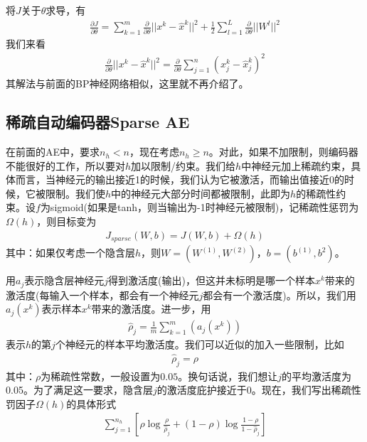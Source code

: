         将$J$关于$\theta$求导，有
        \begin{align*}
        \frac{\partial J}{\partial \theta} = \sum_{k=1}^m\frac{\partial }{\partial \theta}||x^{k} - \hat{x}^k||^2 + \frac{1}{2}\sum_{l=1}^L \frac{\partial }{\partial \theta}||W^l||^2
        \end{align*}
        我们来看
        \begin{align*}
        \frac{\partial }{\partial \theta}||x^{k} - \hat{x}^k||^2  = \frac{\partial }{\partial \theta}\sum_{j=1}^{n}(x_j^k - \hat{x}_j^k)^2
        \end{align*}
        其解法与前面的BP神经网络相似，这里就不再介绍了。
    \subsection{稀疏自动编码器Sparse AE}
        \par
        在前面的AE中，要求$n_h<n$，现在考虑$n_h \geqslant n$。对此，如果不加限制，则编码器不能很好的工作，所以要对$h$加以限制/约束。我们给$h$中神经元加上稀疏约束，具体而言，当神经元的输出接近1的时候，我们认为它被激活，而输出值接近0的时候，它被限制。我们使$h$中的神经元大部分时间都被限制，此即为$h$的稀疏性约束。设$f$为sigmoid(如果是tanh，则当输出为-1时神经元被限制)，记稀疏性惩罚为$\Omega(h)$，则目标变为
        \begin{align*}
        J_{sparse}(W,b) = J(W,b) + \Omega (h)
        \end{align*}
        其中：如果仅考虑一个隐含层$h$，则$W = (W^{(1)},W^{(2)})$，$b= (b^{(1)},b^{2})$。
        \par
        用$a_j$表示隐含层神经元$j$得到激活度(输出)，但这并未标明是哪一个样本$x^k$带来的激活度(每输入一个样本，都会有一个神经元$j$都会有一个激活度)。所以，我们用$a_j(x^k)$表示样本$x^k$带来的激活度。进一步，用
        \begin{align*}
        \hat{\rho}_j = \frac{1}{m} \sum_{k=1}^m \left( a_j(x^k) \right)
        \end{align*}
        表示$h$的第$j$个神经元的样本平均激活度。我们可以近似的加入一些限制，比如
        \begin{align*}
        \hat{\rho}_j = \rho
        \end{align*}
        其中：$\rho$为稀疏性常数，一般设置为$0.05$。换句话说，我们想让$j$的平均激活度为0.05。为了满足这一要求，隐含层$j$的激活度庇护接近于0。现在，我们写出稀疏性罚因子$\Omega(h)$的具体形式
        \begin{align*}
        \sum_{j=1}^{n_h} \left[ \rho\log\frac{\rho}{\hat{\rho}_j}+ (1-\rho)\log\frac{1-\rho}{1-\hat{\rho}_j}  \right]
        \end{align*}
